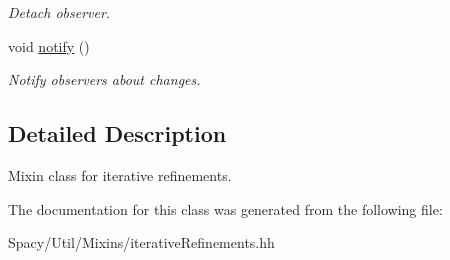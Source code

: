 \begin{DoxyCompactItemize}
\begin{DoxyCompactList}\small\item\em Detach observer. \end{DoxyCompactList}\item 
\hypertarget{classSpacy_1_1Mixin_1_1MixinConnection_a1ddeaa78a3bb4a38c2cca36d1f99fe36}{}void \hyperlink{classSpacy_1_1Mixin_1_1MixinConnection_a1ddeaa78a3bb4a38c2cca36d1f99fe36}{notify} ()\label{classSpacy_1_1Mixin_1_1MixinConnection_a1ddeaa78a3bb4a38c2cca36d1f99fe36}

\begin{DoxyCompactList}\small\item\em Notify observers about changes. \end{DoxyCompactList}\end{DoxyCompactItemize}


\subsection{Detailed Description}
Mixin class for iterative refinements. 

The documentation for this class was generated from the following file\+:\begin{DoxyCompactItemize}
\item 
Spacy/\+Util/\+Mixins/iterative\+Refinements.\+hh\end{DoxyCompactItemize}
